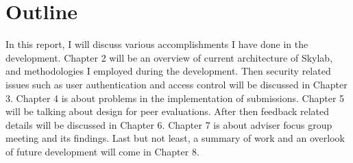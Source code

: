\section{Outline}

In this report, I will discuss various accomplishments I have done in the development. Chapter 2 will be an overview of current architecture of Skylab, and methodologies I employed during the development. Then security related issues such as user authentication and access control will be discussed in Chapter 3. Chapter 4 is about problems in the implementation of submissions. Chapter 5 will be talking about design for peer evaluations. After then feedback related details will be discussed in Chapter 6. Chapter 7 is about adviser focus group meeting and its findings. Last but not least, a summary of work and an overlook of future development will come in Chapter 8.


